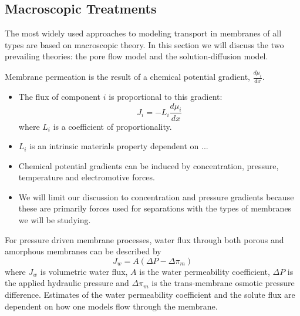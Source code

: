 
  \subsection{Macroscopic Treatments}
  
  The most widely used approaches to modeling transport in membranes of all types
  are based on macroscopic theory. In this section we will discuss the two prevailing
  theories: the pore flow model and the solution-diffusion model.
  
  \noindent Membrane permeation is the result of a chemical potential gradient, $\frac{d\mu_i}{dx}$.
  \begin{itemize}
	  \item The flux of component $i$ is proportional to this gradient:
	  \begin{equation}
	    J_i = -L_i \frac{d\mu_i}{dx}
	  \end{equation}
	  where $L_i$ is a coefficient of proportionality.~\cite{wijmans_solution-diffusion_1995}
	  \item $L_i$ is an intrinsic materials property dependent on ... %
	  \item Chemical potential gradients can be induced by concentration, pressure, 
	  temperature and electromotive forces.
	  \item We will limit our discussion to concentration and pressure gradients because 
	  these are primarily forces used for separations with the types of membranes we 
	  will be studying.
  \end{itemize}

  For pressure driven membrane processes, water flux through both porous and 
  amorphous membranes can be described by
  \begin{equation}
  J_w = A(\Delta P - \Delta \pi_m)
  \end{equation}
  where $J_w$ is volumetric water flux, $A$ is the water permeability coefficient,
  $\Delta P$ is the applied hydraulic pressure and $\Delta \pi_m$ is the 
  trans-membrane osmotic pressure difference. Estimates of the water permeability 
  coefficient and the solute flux are dependent on how one models flow through the 
  membrane.

